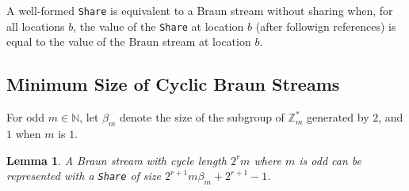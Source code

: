 \documentclass[envcountsect]{llncs}
\newcommand{\share}{{\tt Share} }
\newtheorem{lemma}[theorem]{Lemma}
\begin{document}
A well-formed \share is equivalent to a Braun stream without sharing when, for all locations $b$, the value of the \share at location $b$ (after followign references) is equal to the value of the Braun stream at location $b$.

\subsection{Minimum Size of Cyclic Braun Streams}

For odd $m \in \mathbb{N}$, let $\beta_m$ denote the size of the subgroup of $\mathbb{Z}_m^*$ generated by $2$, and $1$ when $m$ is $1$.
\begin{lemma}
\label{cycleSize}
A Braun stream with cycle length $2^r m$ where $m$ is odd can be represented with a \share of size $2^{r+1} m \beta_m + 2^{r+1} - 1$.
\end{lemma}
\end{document}
